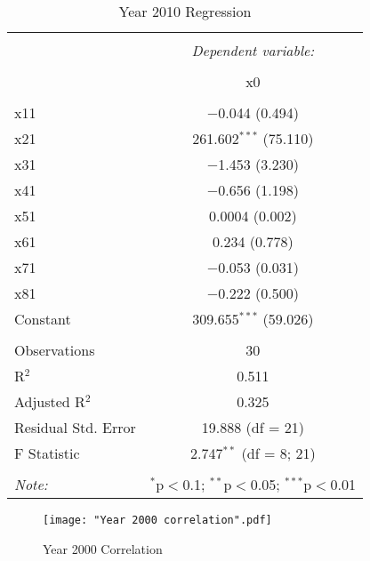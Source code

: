 \documentclass[12pt,english]{article}
\begin{document}
\begin{table}[!htbp] \centering 
  \caption{Year 2010 Regression} 
  \label{} 
\begin{tabular}{@{\extracolsep{1pt}}lc} 
\\[-1.8ex]\hline 
\hline \\[-1.8ex] 
 & \multicolumn{1}{c}{\textit{Dependent variable:}} \\ 
\cline{2-2} 
\\[-1.8ex] & x0 \\ 
\hline \\[-1.8ex] 
 x11 & $-$0.044 (0.494) \\ 
  x21 & 261.602$^{***}$ (75.110) \\ 
  x31 & $-$1.453 (3.230) \\ 
  x41 & $-$0.656 (1.198) \\ 
  x51 & 0.0004 (0.002) \\ 
  x61 & 0.234 (0.778) \\ 
  x71 & $-$0.053 (0.031) \\ 
  x81 & $-$0.222 (0.500) \\ 
  Constant & 309.655$^{***}$ (59.026) \\ 
 \hline \\[-1.8ex] 
Observations & 30 \\ 
R$^{2}$ & 0.511 \\ 
Adjusted R$^{2}$ & 0.325 \\ 
Residual Std. Error & 19.888 (df = 21) \\ 
F Statistic & 2.747$^{**}$ (df = 8; 21) \\ 
\hline 
\hline \\[-1.8ex] 
\textit{Note:}  & \multicolumn{1}{r}{$^{*}$p$<$0.1; $^{**}$p$<$0.05; $^{***}$p$<$0.01} \\ 
\end{tabular} 
\end{table} 
\newpage


\begin{figure}[!hb]
\caption{Year 2000 Correlation}
\centering
\texttt{[image: "Year 2000 correlation".pdf]}
\end{figure}





\end{document}
